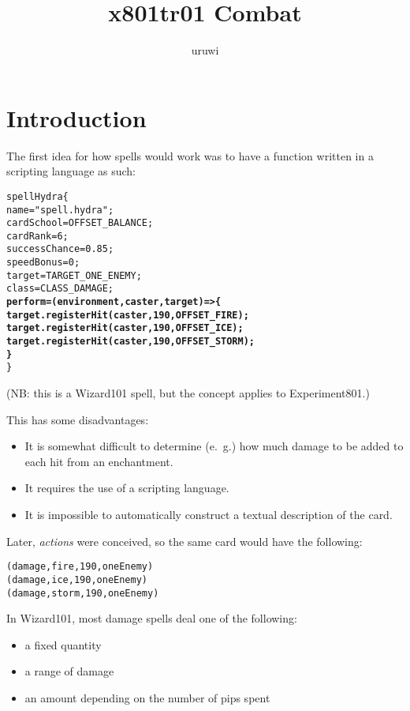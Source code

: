 \documentclass{article}
\title{x801tr01 Combat}
\author{uruwi}
\begin{document}
\pagecolor{Rhodamine!15}

\maketitle

\trsummary

\section{Introduction}

The first idea for how spells would work was to have a function written in a scripting language as such:

\begin{alltt}
spell Hydra \{
  name = "spell.hydra";
  cardSchool = OFFSET_BALANCE;
  cardRank = 6;
  successChance = 0.85;
  speedBonus = 0;
  target = TARGET_ONE_ENEMY;
  class = CLASS_DAMAGE;
  \textbf{perform = (environment, caster, target) => \{
    target.registerHit(caster, 190, OFFSET_FIRE);
    target.registerHit(caster, 190, OFFSET_ICE);
    target.registerHit(caster, 190, OFFSET_STORM);
  \}}
\}
\end{alltt}

(NB: this is a Wizard101 spell, but the concept applies to Experiment801.)

This has some disadvantages:

\begin{itemize}
  \item It is somewhat difficult to determine (e.~g.) how much damage to be added to each hit from an enchantment.
  \item It requires the use of a scripting language.
  \item It is impossible to automatically construct a textual description of the card.
\end{itemize}

Later, \emph{actions} were conceived, so the same card would have the following:

\begin{alltt}
(damage, fire, 190, oneEnemy)
(damage, ice, 190, oneEnemy)
(damage, storm, 190, oneEnemy)
\end{alltt}

In Wizard101, most damage spells deal one of the following:

\begin{itemize}
  \item a fixed quantity
  \item a range of damage
  \item an amount depending on the number of pips spent
\end{itemize}
\end{document}
